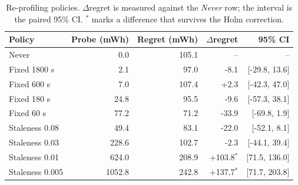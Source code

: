 
\begin{table}[t]
  \centering
  \caption{Re-profiling policies. $\Delta$regret is measured against the
    \emph{Never} row; the interval is the paired 95\% CI. $^{*}$ marks a
    difference that survives the Holm correction.}
  \label{tab:reprofiling}
  \small
  \begin{tabular}{lrrrr}
    \toprule
    Policy & Probe (mWh) & Regret (mWh) & $\Delta$regret & 95\% CI \\
    \midrule
    Never & 0.0 & 105.1 & -- & -- \\
    Fixed 1800 s & 2.1 & 97.0 & -8.1 & [-29.8, 13.6] \\
    Fixed 600 s & 7.0 & 107.4 & +2.3 & [-42.3, 47.0] \\
    Fixed 180 s & 24.8 & 95.5 & -9.6 & [-57.3, 38.1] \\
    Fixed 60 s & 77.2 & 71.2 & -33.9 & [-69.8, 1.9] \\
    Staleness 0.08 & 49.4 & 83.1 & -22.0 & [-52.1, 8.1] \\
    Staleness 0.03 & 228.6 & 102.7 & -2.3 & [-44.1, 39.4] \\
    Staleness 0.01 & 624.0 & 208.9 & +103.8$^{*}$ & [71.5, 136.0] \\
    Staleness 0.005 & 1052.8 & 242.8 & +137.7$^{*}$ & [71.7, 203.8] \\
    \bottomrule
  \end{tabular}
\end{table}
